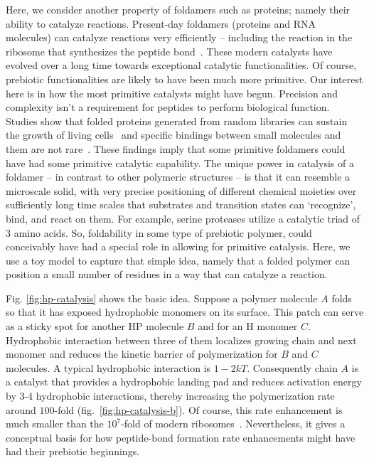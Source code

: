 \documentclass[journal=jacsat,manuscript=article,layout=twocolumn]{achemso}
\begin{document}
Here, we consider another property of foldamers such as proteins; namely their ability 
to catalyze reactions.   Present-day foldamers (proteins and RNA molecules) can catalyze reactions 
very efficiently -- including the reaction in the ribosome that synthesizes the peptide 
bond~\cite{Stachelhaus1998}. These modern catalysts have evolved over a long time towards 
exceptional catalytic functionalities.  Of course, prebiotic functionalities are likely to have been 
much more primitive.  Our interest here is in how the most primitive catalysts might have begun.  
Precision and complexity isn't a requirement for peptides to perform biological function. Studies 
show that folded proteins generated from random libraries can sustain the growth of living 
cells~\cite{Fisher2011} and specific bindings between small molecules and them are not 
rare~\cite{Cherny2012}. These findings imply that some primitive foldamers could have had some 
primitive catalytic capability.  The unique power in catalysis of a foldamer -- in contrast to other 
polymeric structures -- is that it can resemble a microscale solid, with very precise positioning of 
different chemical moieties over sufficiently long time scales that substrates and transition states 
can `recognize', bind, and react on them.  For example, serine proteases utilize a catalytic triad 
of 3 amino acids.  So, foldability in some type of prebiotic polymer, could conceivably have had a 
special role in allowing for primitive catalysis.  Here, we use a toy model to capture that simple 
idea, namely that a folded polymer can position a small number of residues in a way that can 
catalyze a reaction.  

Fig. \ref{fig:hp-catalysis} shows the basic idea.  Suppose a polymer molecule $A$ folds 
so that it has 
exposed hydrophobic monomers on its surface.  This patch can serve as a sticky spot for 
another HP molecule $B$ and for an H monomer $C$.  Hydrophobic interaction between three of them 
localizes growing chain and next monomer and reduces the kinetic barrier of polymerization for $B$ 
and $C$ molecules.  A typical hydrophobic 
interaction is $1-2kT$.  Consequently chain $A$ is a catalyst that provides a hydrophobic 
landing pad and reduces activation energy by 3-4 hydrophobic interactions, thereby increasing the 
polymerization rate around $ 100$-fold (fig.~\ref{fig:hp-catalysis-b}).  Of course, this rate 
enhancement is much smaller than the $10^7$-fold of modern 
ribosomes~\cite{Sievers2004a}. Nevertheless, it gives a conceptual basis for how peptide-bond 
formation rate enhancements might have had their prebiotic beginnings.
\end{document}
